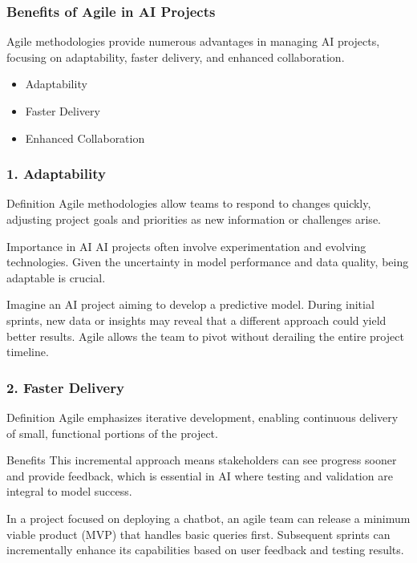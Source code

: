 \documentclass{beamer}
\begin{document}
\begin{frame}[fragile]
    \frametitle{Benefits of Agile in AI Projects}
    Agile methodologies provide numerous advantages in managing AI projects, focusing on adaptability, faster delivery, and enhanced collaboration.
    \begin{itemize}
        \item Adaptability
        \item Faster Delivery
        \item Enhanced Collaboration
    \end{itemize}
\end{frame}

\begin{frame}[fragile]
    \frametitle{1. Adaptability}
    \begin{block}{Definition}
        Agile methodologies allow teams to respond to changes quickly, adjusting project goals and priorities as new information or challenges arise.
    \end{block}
    \begin{block}{Importance in AI}
        AI projects often involve experimentation and evolving technologies. Given the uncertainty in model performance and data quality, being adaptable is crucial.
    \end{block}
    \begin{example}
        Imagine an AI project aiming to develop a predictive model. During initial sprints, new data or insights may reveal that a different approach could yield better results. Agile allows the team to pivot without derailing the entire project timeline.
    \end{example}
\end{frame}

\begin{frame}[fragile]
    \frametitle{2. Faster Delivery}
    \begin{block}{Definition}
        Agile emphasizes iterative development, enabling continuous delivery of small, functional portions of the project.
    \end{block}
    \begin{block}{Benefits}
        This incremental approach means stakeholders can see progress sooner and provide feedback, which is essential in AI where testing and validation are integral to model success.
    \end{block}
    \begin{example}
        In a project focused on deploying a chatbot, an agile team can release a minimum viable product (MVP) that handles basic queries first. Subsequent sprints can incrementally enhance its capabilities based on user feedback and testing results.
    \end{example}
\end{frame}
\end{document}
